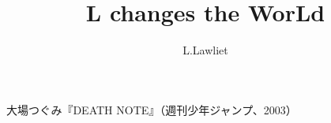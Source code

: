 \documentclass[dvipdfmx, a4paper]{jsarticle}
\title{L changes the WorLd}
\author{L.Lawliet}
\begin{document}
\maketitle

\begin{thebibliography}{9}
   大場つぐみ『DEATH NOTE』（週刊少年ジャンプ、2003）
\end{thebibliography}
\end{document}
